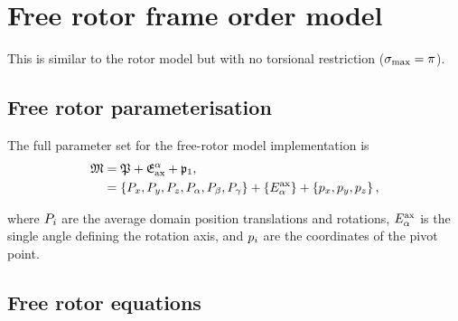 \section{Free rotor frame order model}

This is similar to the rotor model but with no torsional restriction ($\sigma_\textrm{max} = \pi$).


\subsection{Free rotor parameterisation}

The full parameter set for the free-rotor model implementation is
\begin{subequations}
\begin{align}
    \mathfrak{M} &= \mathfrak{P} + \mathfrak{E}^\alpha_\textrm{ax} + \mathfrak{p}_1, \\
              &= \left\{ P_x, P_y, P_z, P_\alpha, P_\beta, P_\gamma \right\} + \left\{ E_\alpha^{\textrm{ax}} \right\} + \left\{ p_x, p_y, p_z \right\},
\end{align}
\end{subequations}

where $P_i$ are the average domain position translations and rotations, $E_\alpha^{\textrm{ax}}$ is the single angle defining the rotation axis, and $p_i$ are the coordinates of the pivot point.


\subsection{Free rotor equations}

